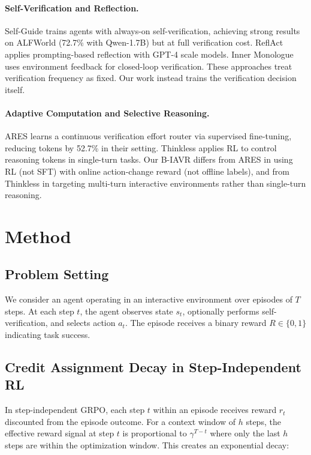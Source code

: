 \documentclass{article}
\begin{document}
\paragraph{Self-Verification and Reflection.}
Self-Guide trains agents with always-on self-verification, achieving strong results on ALFWorld (72.7\% with Qwen-1.7B) but at full verification cost. ReflAct applies prompting-based reflection with GPT-4 scale models. Inner Monologue uses environment feedback for closed-loop verification. These approaches treat verification frequency as fixed. Our work instead trains the verification decision itself.

\paragraph{Adaptive Computation and Selective Reasoning.}
ARES learns a continuous verification effort router via supervised fine-tuning, reducing tokens by 52.7\% in their setting. Thinkless applies RL to control reasoning tokens in single-turn tasks. Our B-IAVR differs from ARES in using RL (not SFT) with online action-change reward (not offline labels), and from Thinkless in targeting multi-turn interactive environments rather than single-turn reasoning.

\section{Method}

\subsection{Problem Setting}

We consider an agent operating in an interactive environment over episodes of $T$ steps. At each step $t$, the agent observes state $s_t$, optionally performs self-verification, and selects action $a_t$. The episode receives a binary reward $R \in \{0, 1\}$ indicating task success.

\subsection{Credit Assignment Decay in Step-Independent RL}

In step-independent GRPO, each step $t$ within an episode receives reward $r_t$ discounted from the episode outcome. For a context window of $h$ steps, the effective reward signal at step $t$ is proportional to $\gamma^{T-t}$ where only the last $h$ steps are within the optimization window. This creates an exponential decay:
\end{document}
